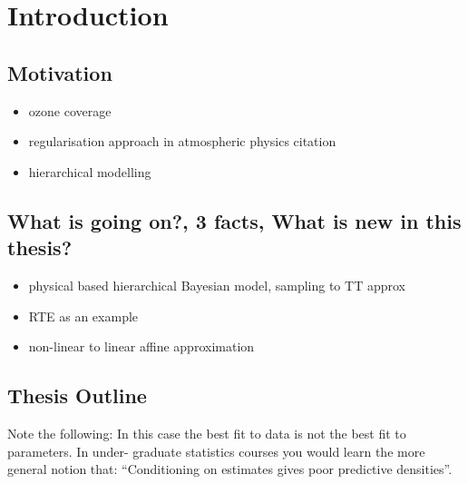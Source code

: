 \chapter{Introduction}
\section{Motivation}
\begin{itemize}
	\item ozone coverage
	\item regularisation approach in atmospheric physics citation
	\item hierarchical modelling
\end{itemize}
\section{What is going on?, 3 facts, What is new in this thesis?}
\begin{itemize}
	\item physical based hierarchical Bayesian model, sampling to TT approx
	\item RTE as an example
	\item non-linear to linear affine approximation
\end{itemize}

\section{Thesis Outline}

Note the following:
In this case the best fit to data is not the best fit to parameters.
 In under-
graduate statistics courses you would learn the more general notion that: “Conditioning
on estimates gives poor predictive densities”.
\cite{tan2016LecNot}